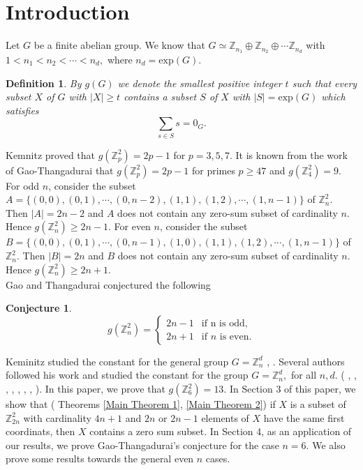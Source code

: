 \documentclass[reqno,10pt]{amsart}
\newtheorem{definition}[prop]{Definition}
\newtheorem{conj}[prop]{Conjecture}
\begin{document}
\section{Introduction}\label{Introduction}
Let $G$ be a finite abelian group. We know that $G \simeq \mathbb{Z}_{n_1} \oplus \mathbb{Z}_{n_2}
\oplus \cdots \mathbb{Z}_{n_d}$ with $1 <  n_1 < n_2  < \cdots < n_d,$ where $n_d = \mathrm{exp}(G).$
\begin{definition}
By $g(G)$ we denote the smallest positive integer $t$ such that every subset $X$ of $G$ with
$|X| \geq t$ contains a subset $S$ of $X$ with $|S| = \mathrm{exp}(G)$ which satisfies
$$\sum_{s \in S} s = 0_G.$$
\end{definition}
Kemnitz 
 \cite{K82} proved that $g(\mathbb{Z}^2_p) = 2p - 1$ for $p = 3, 5, 7.$
 It is known from the work of Gao-Thangadurai that  $g(\mathbb{Z}^2_p) = 2p - 1$ for primes
 $ p \geq 47$ and $g(\mathbb{Z}^2_4)= 9.$ 
For odd $n$, consider the subset $A = \{ (0,0), (0,1),\cdots,(0,n-2), (1,1), (1,2),\cdots,(1,n-1) \}$
of $\mathbb{Z}^2_n.$ Then $|A| =  2n - 2$ and $A$ does not contain any zero-sum subset of cardinality
$n.$  Hence $g(\mathbb{Z}^2_n) \geq 2n - 1.$ For even $n$, consider the subset $B = \{ (0,0), (0,1),\cdots, (0, n-1), (1,0), (1,1), (1,2),\cdots,(1,n-1) \}$
of $\mathbb{Z}^2_n.$ Then $|B| =  2n$ and $B$ does not contain any zero-sum subset of cardinality
$n.$  Hence $g(\mathbb{Z}^2_n) \geq 2n +1.$ 
\\
Gao and Thangadurai conjectured the following \cite{GT04}
\begin{conj}\label{main-conjecture}
\begin{equation*}
g(\mathbb{Z}^2_n)= 
\begin{cases}
2n-1 & \text{if n is odd,} \\
2n+1 &  \text{if $n$ is even.} 
\end{cases}
\end{equation*}
\end{conj}
 Keminitz studied the constant for the general group $G=\mathbb{Z}^d_n$ \cite{K82}, \cite{K83}.
 Several authors followed his work and 
studied the constant for the group $G=\mathbb{Z}^d_n,$ for all $n, d.$ ( \cite{B82}, \cite{BB82}, \cite{G97},
\cite{BE02}, \cite{EFLS02}, \cite{M95}, \cite{R00}, \cite{ST02} ).
In this paper, we prove that $g(\mathbb{Z}^2_6) = 13.$ In Section 3 of this paper, we show that ( Theorems \ref{Main Theorem 1}, \ref{Main Theorem 2}) if $X$ is a subset of $\mathbb{Z}^2_{2n}$ with cardinality $4n+1$ and $2n$ or $2n-1$ elements of $X$ have the same first coordinats, then $X$ contains a zero sum subset. In Section 4, as an application of our results, we prove Gao-Thangadurai's conjecture for the case $n=6.$ We also prove some results towards the general even $n$ cases.
\end{document}
